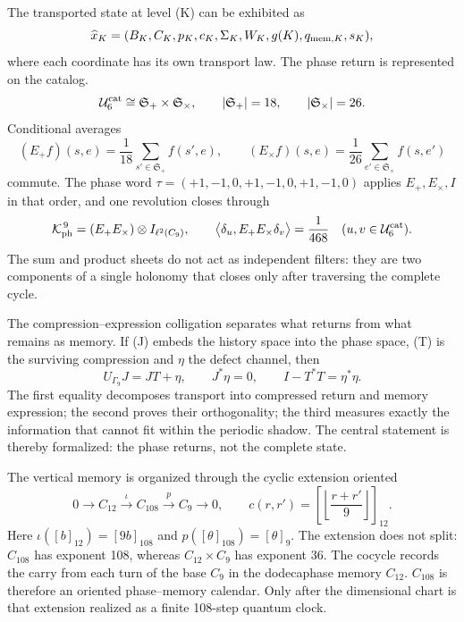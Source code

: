 {The transported state at level (K) can be exhibited as
\begin{equation}
\widehat x_K=
(B_K,C_K,p_K,c_K,\Sigma_K,W_K,g(K),q_{{\rm mem},K},s_K),
\label{p12-83-c3-s1:eq:enriched-state-k}
\end{equation}
where each coordinate has its own transport law. The phase return is represented on the catalog.
\[
\mathcal U_6^{\rm cat}\cong\mathfrak S_+\times\mathfrak S_\times,
\qquad |\mathfrak S_+|=18,
\qquad |\mathfrak S_\times|=26.
\]
Conditional averages
\[
(E_+f)(s,e)=\frac1{18}\sum_{s'\in\mathfrak S_+}f(s',e),
\qquad
(E_\times f)(s,e)=\frac1{26}\sum_{e'\in\mathfrak S_\times}f(s,e')
\]
commute. The phase word
\(\tau=(+1,-1,0,+1,-1,0,+1,-1,0)\) applies
\(E_+,E_\times,I\) in that order, and one revolution closes through
\begin{equation}
\mathcal K_{\rm ph}^{\,9}
=(E_+E_\times)\otimes I_{\ell^2(C_9)},
\qquad
\bigl\langle\delta_u,E_+E_\times\delta_v\bigr\rangle
=\frac1{468}\quad(u,v\in\mathcal U_6^{\rm cat}).
\label{p12-83-c3-s1:eq:joint-nine-holonomy}
\end{equation}
The sum and product sheets do not act as independent filters: they are two
components of a single holonomy that closes only after traversing the
complete cycle.

The compression--expression colligation separates what returns from what remains
as memory. If (J) embeds the history space into the phase
space, (T) is the surviving compression and \(\eta\) the defect channel,
then
\begin{equation}
\boxed{
U_{\Gamma_9}J=JT+\eta,
\qquad J^*\eta=0,
\qquad I-T^*T=\eta^*\eta.}
\label{p12-83-c3-s1:eq:compression-expression}
\end{equation}
The first equality decomposes transport into compressed return and memory
expression; the second proves their orthogonality; the third measures exactly
the information that cannot fit within the periodic shadow. The central
statement is thereby formalized: the phase returns, not the complete state.

The vertical memory is organized through the cyclic extension oriented
\begin{equation}
0\longrightarrow C_{12}\xrightarrow{\,\iota\,}C_{108}
\xrightarrow{\,p\,}C_9\longrightarrow0,
\qquad
c(r,r')=\left[\left\lfloor\frac{r+r'}9\right\rfloor\right]_{12}.
\label{p12-83-c3-s1:eq:c108-extension}
\end{equation}
Here \(\iota([b]_{12})=[9b]_{108}\) and
\(p([\theta]_{108})=[\theta]_9\). The extension does not split:
\(C_{108}\) has exponent 108, whereas
\(C_{12}\times C_9\) has exponent 36.
The cocycle records the carry from each turn of the base \(C_9\) in the
dodecaphase memory \(C_{12}\). \(C_{108}\) is therefore an oriented
phase--memory calendar. Only after the dimensional chart is that
extension realized as a finite 108-step quantum clock.

}
